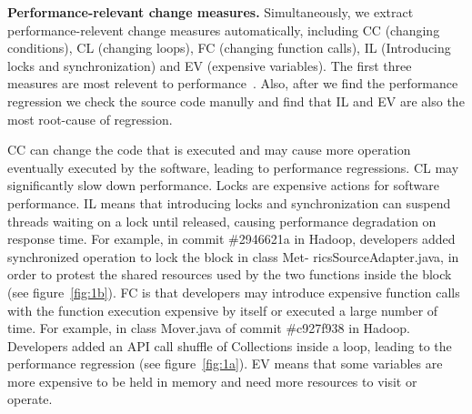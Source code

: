 \textbf{Performance-relevant change measures.} Simultaneously, we extract performance-relevent change measures automatically, including CC (changing conditions), CL (changing loops), FC (changing function calls), IL (Introducing locks and synchronization) and EV (expensive variables). The first three measures are most relevent to performance~\cite{ACM2016:Luo}. Also, after we find the performance regression we check the source code manully and find that IL and EV are also the most root-cause of regression. 

CC can change the code that is executed and may cause more operation eventually executed by the software, leading to performance regressions. CL may significantly slow down performance. Locks are expensive actions for software performance. IL means that introducing locks and synchronization can suspend threads waiting on a lock until released, causing performance degradation on response time.  For example, in commit \#2946621a in Hadoop, developers added synchronized operation to lock the block in class Met- ricsSourceAdapter.java, in order to protest the shared resources used by the two functions inside the block (see figure~\ref{fig:1b}). FC is that developers may introduce expensive function calls with the function execution expensive by itself or executed a large number of time. For example, in class Mover.java of commit \#c927f938 in Hadoop. Developers added an API call shuffle of Collections inside a loop, leading to the performance regression (see figure~\ref{fig:1a}).
EV means that some variables are more expensive to be held in memory and need more resources to visit or operate. 

